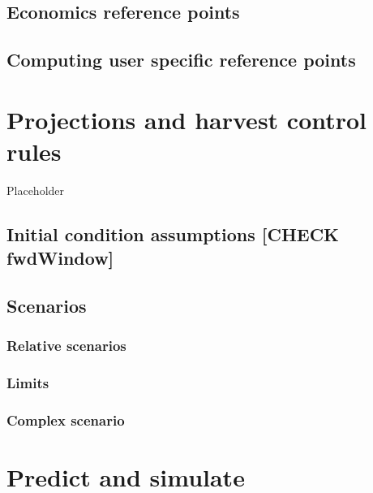 \documentclass[
]{book}
\begin{document}
\hypertarget{economics-reference-points}{%
\section{Economics reference points}\label{economics-reference-points}}

\hypertarget{computing-user-specific-reference-points}{%
\section{Computing user specific reference points}\label{computing-user-specific-reference-points}}

\hypertarget{projections-and-harvest-control-rules}{%
\chapter{Projections and harvest control rules}\label{projections-and-harvest-control-rules}}

Placeholder

\hypertarget{initial-condition-assumptions-check-fwdwindow}{%
\section{Initial condition assumptions {[}CHECK fwdWindow{]}}\label{initial-condition-assumptions-check-fwdwindow}}

\hypertarget{scenarios}{%
\section{Scenarios}\label{scenarios}}

\hypertarget{relative-scenarios}{%
\subsection{Relative scenarios}\label{relative-scenarios}}

\hypertarget{limits}{%
\subsection{Limits}\label{limits}}

\hypertarget{complex-scenario}{%
\subsection{Complex scenario}\label{complex-scenario}}

\hypertarget{predict-and-simulate}{%
\chapter{\texorpdfstring{Predict and simulate \label{sec:predsim}}{Predict and simulate }}\label{predict-and-simulate}}
\end{document}
